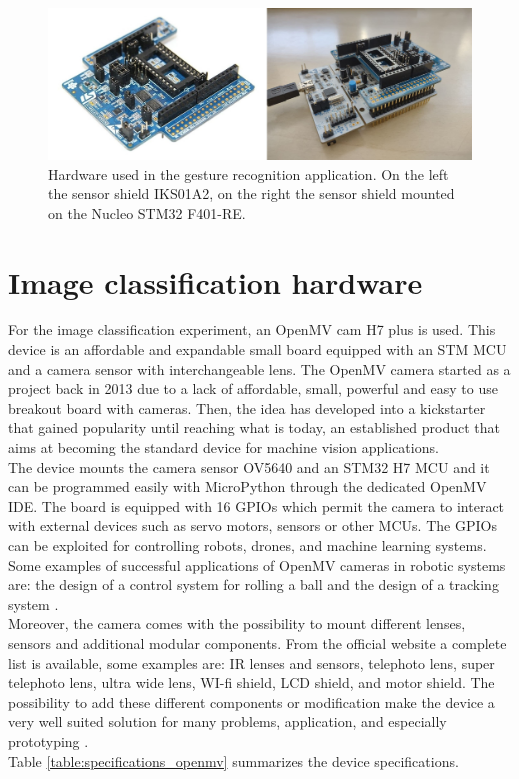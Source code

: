 \documentclass[12pt]{report}
\begin{document}
\begin{figure}[h!]
    \centering
    \includegraphics[width=120mm]{Figures/Chapter2/hardware_stm.jpg} 
    \caption{Hardware used in the gesture recognition application. On the left the sensor shield IKS01A2, on the right the sensor shield mounted on the Nucleo STM32 F401-RE.}
    \label{fig:hardware_stm}    
\end{figure}



\section{Image classification hardware}
For the image classification experiment, an OpenMV cam H7 plus \cite{abdelkader2017openmv} \cite{openmv_web_page} is used. This device is an affordable and expandable small board equipped with an STM MCU and a camera sensor with interchangeable lens. The OpenMV camera started as a project \cite{openmv_project} back in 2013 due to a lack of affordable, small, powerful and easy to use breakout board with cameras. Then, the idea has developed into a kickstarter that gained popularity until reaching what is today, an established product that aims at becoming the standard device for machine vision applications. \\
The device mounts the camera sensor OV5640 and an STM32 H7 MCU and it can be programmed easily with MicroPython through the dedicated OpenMV IDE. The board is equipped with 16 GPIOs which permit the camera to interact with external devices such as servo motors, sensors or other MCUs. The GPIOs can be exploited for controlling robots, drones, and machine learning systems. Some examples of successful applications of OpenMV cameras in robotic systems are: the design of a control system for rolling a ball \cite{zhou2019design} and the design of a tracking system \cite{wei2020design}.\\
Moreover, the camera comes with the possibility to mount different lenses, sensors and additional modular components. From the official website a complete list is available, some examples are: IR lenses and sensors, telephoto lens, super telephoto lens, ultra wide lens, WI-fi shield, LCD shield, and motor shield.
The possibility to add these different components or modification make the device a very well suited solution for many problems, application, and especially prototyping .\\
Table \ref{table:specifications_openmv} summarizes the device specifications.\\
\end{document}
